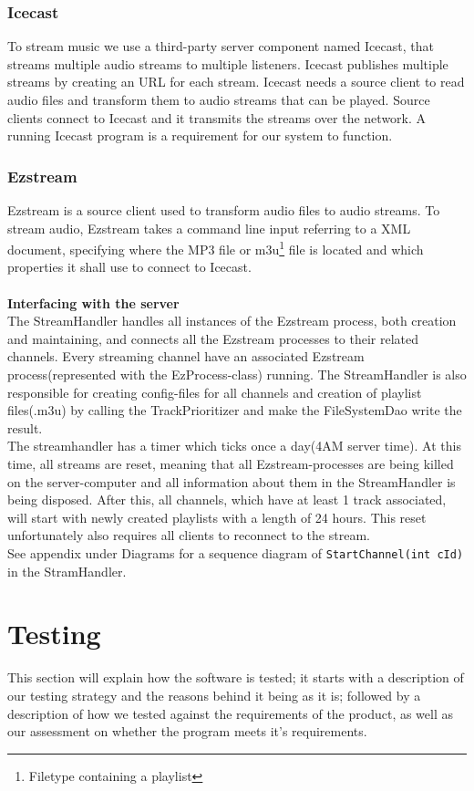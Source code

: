 \documentclass[a4paper,11pt,report]{article}
\begin{document}
\subsubsection{Icecast}
To stream music we use a third-party server component named Icecast\cite{IceCast}, that streams multiple audio streams to multiple listeners. Icecast publishes multiple streams by creating an URL for each stream. Icecast needs a source client to read audio files and transform them to audio streams that can be played. Source clients connect to Icecast and it transmits the streams over the network. A running Icecast program is a requirement for our system to function.
\subsubsection{Ezstream}
Ezstream\cite{Ezstream} is a source client used to transform audio files to audio streams. To stream audio, Ezstream takes a command line input referring to a XML document, specifying where the MP3 file or m3u\footnote{Filetype containing a playlist} file is located and which properties it shall use to connect to Icecast. \\ \\
\textbf{Interfacing with the server} \\
The StreamHandler handles all instances of the Ezstream process, both creation and maintaining, and connects all the Ezstream processes to their related channels. Every streaming channel have an associated Ezstream process(represented with the EzProcess-class) running. The StreamHandler is also responsible for creating config-files for all channels and creation of playlist files(.m3u) by calling the TrackPrioritizer and make the FileSystemDao write the result. \\

The streamhandler has a timer which ticks once a day(4AM server time). At this time, all streams are reset, meaning that all Ezstream-processes are being killed on the server-computer and all information about them in the StreamHandler is being disposed. After this, all channels, which have at least 1 track associated, will start with newly created playlists with a length of 24 hours. This reset unfortunately also requires all clients to reconnect to the stream. \\

See appendix under Diagrams for a sequence diagram of \texttt{StartChannel(int cId)} in the StramHandler.


\section{Testing}
This section will explain how the software is tested; it starts with a description of our testing strategy and the reasons behind it being
as it is; followed by a description of how we tested against the requirements of the product, as well as our assessment on whether the program meets it's requirements.
\end{document}
